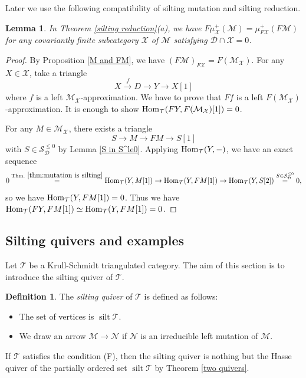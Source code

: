 \documentclass[a4paper,reqno]{amsart}
\newtheorem{lemma}[theorem]{Lemma}
\theoremstyle{definition}
\newtheorem{definition}[theorem]{Definition}
\newcommand{\DD}{{\mathcal D}}
\newcommand{\SSS}{{\mathcal S}}
\newcommand{\TT}{{\mathcal T}}
\newcommand{\MM}{{\mathcal M}}
\newcommand{\NN}{{\mathcal N}}
\newcommand{\XX}{{\mathcal X}}
\newcommand{\silt}{\operatorname{silt}\nolimits}
\newcommand{\homo}[3]{{\rm{Hom}}_{#1}(#2, #3)} %
\begin{document}
Later we use the following compatibility of silting mutation and silting reduction.

\begin{lemma}\label{compatibility}
In Theorem \ref{silting reduction}(a), we have $F\mu^+_{\XX}(\MM)=\mu^+_{F\XX}(F\MM)$ for any covariantly finite subcategory $\XX$ of $\MM$ satisfying $\DD\cap\XX=0$.
\end{lemma}

\begin{proof}
By Proposition \ref{M and FM}, we have $(F\MM)_{F\XX}=F(\MM_{\XX})$.
For any $X\in\XX$, take a triangle
\[X\stackrel{f}{\to} D\to Y\to X[1]\]
where $f$ is a left $\MM_{\XX}$-approximation. 
We have to prove that $Ff$ is a left $F(\MM_{\XX})$-approximation.
It is enough to show $\homo{\TT}{FY}{F(\MM_{\XX})[1]}=0$.  

For any $M\in \MM_{\XX}$, there exists a triangle 
\begin{equation}%
S \to M \to FM \to S[1]
\end{equation}
with $S\in \SSS^{\leq 0}_{\DD}$ by Lemma \ref{S in S^le0}.
Applying $\homo{\TT}{Y}{-}$, we have an exact sequence 
\[
0 \stackrel{{\rm Thm.}\ \ref{thm:mutation is silting}}{=}  \homo{\TT}{Y}{M[1]}\to \homo{\TT}{Y}{FM[1]} \to 
\homo{\TT}{Y}{S[2]}\stackrel{S\in \SSS^{\leq 0}_{\DD}}{=}0,
\]
so we have $\homo{\TT}{Y}{FM[1]}=0$.
Thus we have $\homo{\TT}{FY}{FM[1]}\simeq \homo{\TT}{Y}{FM[1]}=0$. 
\end{proof}


\subsection{Silting quivers and examples}

Let $\TT$ be a Krull-Schmidt triangulated category.
The aim of this section is to introduce the silting quiver of $\TT$.

\begin{definition}
The \emph{silting quiver} of $\TT$ is defined as follows:
\begin{itemize}
\item The set of vertices is $\silt\TT$.
\item We draw an arrow $\MM\to\NN$ if $\NN$ is an irreducible left mutation of $\MM$.
\end{itemize}
If $\TT$ satisfies the condition (F), then the silting quiver is nothing but the Hasse quiver of the partially ordered set $\silt\TT$ by Theorem \ref{two quivers}.
\end{definition}
\end{document}
